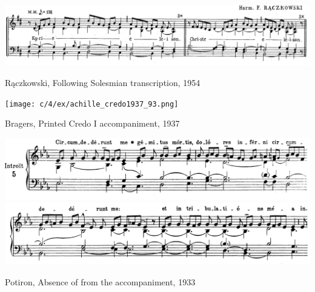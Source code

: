 \begin{landscape}

  \vspace*{\fill}

  \begin{example}
    \centering
    \includegraphics[width=.9\linewidth]{c/4/ex/raczkowski_angelis_41.png}
    \caption{Rączkowski, Following Solesmian transcription, 1954}
    \label{mus:raczkowski_angelis_41}
  \end{example}

  \vspace*{\fill}
\end{landscape}

\vspace*{\fill}

\begin{example}
  \centering
  \texttt{[image: c/4/ex/achille\_credo1937\_93.png]}
  \caption{Bragers, Printed Credo I accompaniment, 1937}
  \label{mus:bragers_credo1}
\end{example}

\vspace*{\fill}

\newpage

\vspace*{\fill}

\begin{example}
  \centering
  \includegraphics[width=\linewidth]{c/5/ex/potiron_circumderunt_60.png}
  \includegraphics[width=\linewidth]{c/5/ex/potiron_circumderunt_61.png}
  \caption{Potiron, Absence of  from the accompaniment, 1933}
  \label{mus:potiron_circumderunt}
\end{example}

